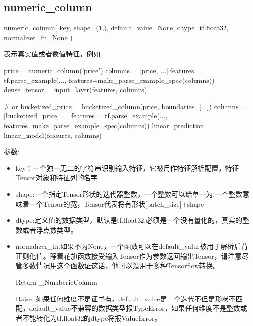 \subsection{numeric\_column}
\begin{python}
numeric_column(
    key,
    shape=(1,),
    default_value=None,
    dtype=tf.float32,
    normalizer_fn=None
)
\end{python}
表示真实值或者数值特征，例如:
\begin{python}
price = numeric_column('price')
columns = [price, ...]
features = tf.parse_example(..., features=make_parse_example_spec(columns))
dense_tensor = input_layer(features, columns)

# or
bucketized_price = bucketized_column(price, boundaries=[...])
columns = [bucketized_price, ...]
features = tf.parse_example(..., features=make_parse_example_spec(columns))
linear_prediction = linear_model(features, columns)
\end{python}
参数:
\begin{itemize}
	\item key：一个独一无二的字符串识别输入特征，它被用作特征解析配置，特征Tensor对象和特征列的名字
	\item shape:一个指定Tensor形状的迭代器整数，一个整数可以给单一为,一个整数意味着一个Tensor的宽，Tensor代表将有形状[batch\_size]+shape
	\item dtype:定义值的数据类型，默认是tf.float32,必须是一个没有量化的，真实的整数或者浮点数类型。
	\item normalizer\_fn:如果不为None，一个函数可以在default\_value被用于解析后背正则化值。睁着花旗函数接受输入Tensor作为参数返回输出Tensor，请注意尽管多数情况用这个函数证这话，他可以没用于多种Tensorflow转换。
	\item[Return] \_NumbericColumn
	\item[Raise]:如果任何维度不是证书有，default\_value是一个迭代不但是形状不匹配，default\_value不兼容的数据类型报TypeError，如果任何维度不是整数或者不能转化为tf.float32的dtype将报ValueError。
\end{itemize}
